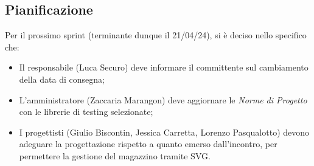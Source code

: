 \subsection{Pianificazione}
\noindent Per il prossimo sprint (terminante dunque il 21/04/24), si è deciso nello specifico che:
\begin{itemize}
    \item Il responsabile (Luca Securo) deve informare il committente sul cambiamento della data di consegna;
    \item L'amministratore (Zaccaria Marangon) deve aggiornare le \textit{Norme di Progetto} con le librerie di testing selezionate;    
    \item I progettisti (Giulio Biscontin, Jessica Carretta, Lorenzo Pasqualotto) devono adeguare la progettazione rispetto a quanto emerso dall'incontro, per permettere la gestione del magazzino tramite SVG.
\end{itemize}